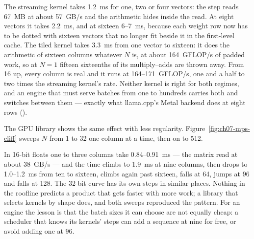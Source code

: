
The streaming kernel takes 1.2~ms for one, two or four vectors: the step reads
67~MB at about 57~GB/s and the arithmetic hides inside the read. At eight vectors
it takes 2.2~ms, and at sixteen 6--7~ms, because each weight row now has to be
dotted with sixteen vectors that no longer fit beside it in the first-level
cache. The tiled kernel takes 3.3~ms from one vector to sixteen: it does the
arithmetic of sixteen columns whatever $N$ is, at about 164~GFLOP/s of padded
work, so at $N = 1$ fifteen sixteenths of its multiply--adds are thrown away.
From 16 up, every column is real and it runs at 164--171~GFLOP/s, one and a
half to two times the streaming kernel's rate. Neither kernel is right for both regimes, and an engine
that must serve batches from one to hundreds carries both and switches between
them --- exactly what llama.cpp's Metal backend does at eight rows
().

The GPU library shows the same effect with less regularity.
Figure~\ref{fig:ch07-mps-cliff} sweeps $N$ from 1 to 32 one column at a time,
then on to 512.


In 16-bit floats one to three columns take 0.84--0.91~ms --- the matrix read at
about 38~GB/s --- and the time climbs to 1.9~ms at nine columns, then drops to
1.0--1.2~ms from ten to sixteen, climbs again past sixteen, falls at 64, jumps
at 96 and falls at 128. The 32-bit curve has its own steps in similar places.
Nothing in the roofline predicts a product that gets faster with more work; a
library that selects kernels by shape does, and both sweeps reproduced the
pattern. For an engine the lesson is that the batch sizes it can choose are not
equally cheap: a scheduler that knows its kernels' steps can add a sequence at
nine for free, or avoid adding one at 96.

